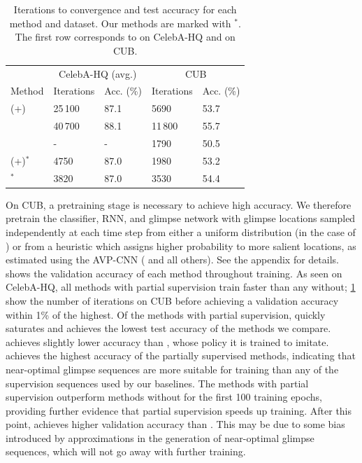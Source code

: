 \begin{table}
  \caption{Iterations to convergence and test accuracy for each method and
    dataset. Our methods are marked with {$^*$}. The first row corresponds to
    \RAM{} on CelebA-HQ and \RAMP{} on CUB.}
  \vspace{-.1cm}
  \label{tab:nogs-results}
  \centering
  \begin{tabular}{lllll}
    \toprule
    \multicolumn{1}{r}{} & \multicolumn{2}{c}{CelebA-HQ (avg.)} & \multicolumn{2}{c}{CUB}                 \\
    \cmidrule(r){2-3} \cmidrule(r){4-5}
    Method     & Iterations & Acc. (\%)  & Iterations & Acc. (\%)  \\
    \midrule
    \RAM{}(+)     & 25\,100     & 87.1           & 5690           & 53.7          \\
    \WSRAM{}             & 40\,700     & {88.1}         & 11\,800        & {55.7}        \\
    \HGS{}               & -           & -              & {1790}         & 50.5          \\
    \PSRAM{}(+)$^*$      & 4750        & 87.0           & 1980           & 53.2          \\
    \PSNOGS{}$^*$        & {3820}      & 87.0           & 3530           & 54.4          \\
    \bottomrule
  \end{tabular}
  \vspace{-.2cm}
\end{table}


 On CUB, a pretraining stage is
necessary to achieve high accuracy. We therefore pretrain the classifier, RNN,
and glimpse network with glimpse locations sampled independently at each time
step from either a uniform distribution (in the case of \RAM) or from a
heuristic which assigns higher probability to more salient locations, as
estimated using the AVP-CNN (\RAMP{} and all others). See the
appendix for details.
 shows the validation accuracy of each method
throughout training.
%
As seen on CelebA-HQ, all methods with partial supervision train faster than any
without; \cref{tab:nogs-results} show the number of iterations on CUB before
achieving a validation accuracy within 1\% of the highest. Of the methods with
partial supervision, \HGS{} quickly saturates and achieves the lowest test
accuracy of the methods we compare. \PSRAMP{} achieves slightly lower accuracy
than \RAMP{}, whose policy it is trained to imitate. \PSNOGS{} achieves the
highest accuracy of the partially supervised methods, indicating that
near-optimal glimpse sequences are more suitable for training than any of the
supervision sequences used by our baselines. The methods with partial
supervision outperform methods without for the first 100 training epochs,
providing further evidence that partial supervision speeds up training. After
this point, \WSRAM{} achieves higher validation accuracy than \PSNOGS{}. This
may be due to some bias introduced by approximations in the generation of
near-optimal glimpse sequences, which will not go away with further training.

